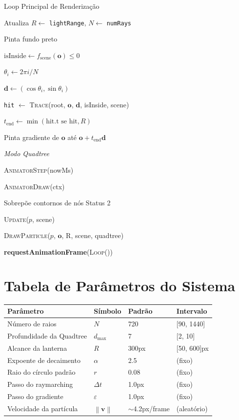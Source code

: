 \documentclass[11pt,a4paper]{article}
\newenvironment{algorithmic}[1][0]{%
    \begin{list}{}{%
        \setlength{\leftmargin}{1.5em}%
        \setlength{\labelsep}{0pt}%
        \setlength{\itemsep}{0pt}%
        \setlength{\topsep}{0pt}%
        \setlength{\parsep}{0pt}%
        \setlength{\partopsep}{0pt}%
    }%
}{%
    \end{list}%
}
\newcommand{\State}{\item[]}
\newcommand{\Procedure}[2]{\item[\textbf{procedure} #1(#2)]}
\newcommand{\EndProcedure}{\item[\textbf{end procedure}]}
\newcommand{\If}[1]{\item[\textbf{if} #1 \textbf{then}]}
\newcommand{\Else}{\item[\textbf{else}]}
\newcommand{\EndIf}{\item[\textbf{end if}]}
\newcommand{\For}[1]{\item[\textbf{for} #1 \textbf{do}]}
\newcommand{\EndFor}{\item[\textbf{end for}]}
\newcommand{\Call}[2]{\textsc{#1}(#2)}
\newcommand{\Comment}[1]{\hfill\textit{#1}}
\theoremstyle{plain}
\theoremstyle{definition}
\newcommand{\vv}[1]{\mathbf{#1}}
\newcommand{\norm}[1]{\left\|#1\right\|}
\newcommand{\eps}{\varepsilon}
\begin{document}
\begin{algorithm}[H]
\caption{Loop Principal de Renderização}
\begin{algorithmic}[1]
\Procedure{Loop}{nowMs}
    \State Atualiza $R \gets$ \texttt{lightRange}, $N \gets$ \texttt{numRays}
    \If{modo = \textsc{Lanterna}}
        \State Pinta fundo preto
        \State $\text{isInside} \gets f_{\text{scene}}(\vv{o}) \leq 0$
        \For{$i = 0$ \textbf{to} $N-1$}
            \State $\theta_i \gets 2\pi i / N$
            \State $\vv{d} \gets (\cos\theta_i, \sin\theta_i)$
            \State \texttt{hit} $\gets$ \Call{Trace}{root, $\vv{o}$, $\vv{d}$, isInside, scene}
            \State $t_{\text{end}} \gets \min(\text{hit.t se hit}, R)$
            \State Pinta gradiente de $\vv{o}$ até $\vv{o} + t_{\text{end}} \vv{d}$
        \EndFor
    \Else \Comment{Modo Quadtree}
        \State \Call{AnimatorStep}{nowMs}
        \State \Call{AnimatorDraw}{ctx}
        \State Sobrepõe contornos de nós Status 2
    \EndIf
    \For{cada partícula $p$}
        \State \Call{Update}{$p$, scene}
        \State \Call{DrawParticle}{$p$, $\vv{o}$, R, scene, quadtree}
    \EndFor
    \State \textbf{requestAnimationFrame}(\Call{Loop}{})
\EndProcedure
\end{algorithmic}
\end{algorithm}

\section{Tabela de Parâmetros do Sistema}

\begin{center}
\begin{tabular}{llll}
\toprule
\textbf{Parâmetro} & \textbf{Símbolo} & \textbf{Padrão} & \textbf{Intervalo} \\
\midrule
Número de raios          & $N$           & 720   & [90, 1440]  \\
Profundidade da Quadtree & $d_{\max}$    & 7     & [2, 10]     \\
Alcance da lanterna      & $R$           & 300px & [50, 600]px \\
Expoente de decaimento   & $\alpha$      & 2.5   & (fixo)      \\
Raio do círculo padrão   & $r$           & 0.08  & (fixo)      \\
Passo do raymarching     & $\Delta t$    & 1.0px & (fixo)      \\
Passo do gradiente       & $\eps$        & 1.0px & (fixo)      \\
Velocidade da partícula  & $\norm{\vv{v}}$ & $\sim$4.2px/frame & (aleatório) \\
\bottomrule
\end{tabular}
\end{center}
\end{document}
